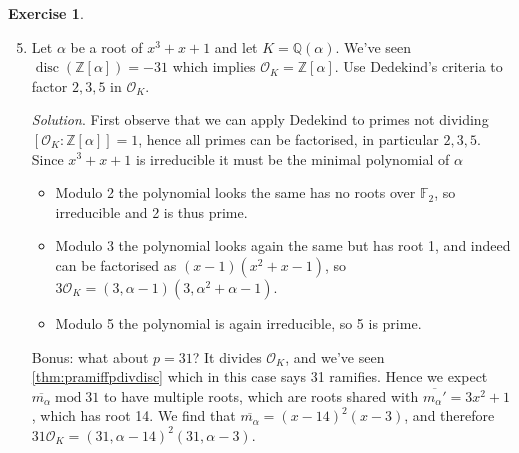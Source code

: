 \documentclass{article}
\newcommand{\Z}{\mathbb{Z}}
\newcommand{\Q}{\mathbb{Q}}
\newcommand{\F}{\mathbb{F}}
\newcommand{\Mod}{\operatorname{mod}}
\newcommand{\disc}{\operatorname{disc}}
\newcommand{\ri}{\mathcal{O}}
\theoremstyle{definition}
\newtheorem{exe}[defn]{Exercise}
\begin{document}
\begin{exe}
\begin{enumerate}
\setcounter{enumi}{4}
\item Let $\alpha$ be a root of $x^3+x+1$ and let $K=\Q(\alpha)$. We've seen $\disc(\Z[\alpha])=-31$ which implies $\ri_K=\Z[\alpha]$. Use Dedekind's criteria to factor $2,3,5$ in $\ri_K$.

\textit{Solution}. First observe that we can apply Dedekind to primes not dividing $[\ri_K:\Z[\alpha]]=1$, hence all primes can be factorised, in particular $2,3,5$. Since $x^3+x+1$ is irreducible it must be the minimal polynomial of $\alpha$
\begin{itemize}
\item Modulo 2 the polynomial looks the same has no roots over $\F_2$, so irreducible and 2 is thus prime.
\item Modulo 3 the polynomial looks again the same but has root 1, and indeed can be factorised as $(x-1)(x^2+x-1)$, so $3\ri_K=(3,\alpha-1)(3,\alpha^2+\alpha-1)$.
\item Modulo 5 the polynomial is again irreducible, so 5 is prime.
\end{itemize}
Bonus: what about $p=31$? It divides $\ri_K$, and we've seen \ref{thm:pramiffpdivdisc} which in this case says 31 ramifies. Hence we expect $\overline{m_\alpha}\Mod 31$ to have multiple roots, which are roots shared with $\overline{m_\alpha'}=3x^2+1$, which has root 14. We find that $\overline{m_\alpha}=(x-14)^2(x-3)$, and therefore $31\ri_K=(31,\alpha-14)^2(31,\alpha-3)$.


\end{enumerate}
\end{exe}
\end{document}
